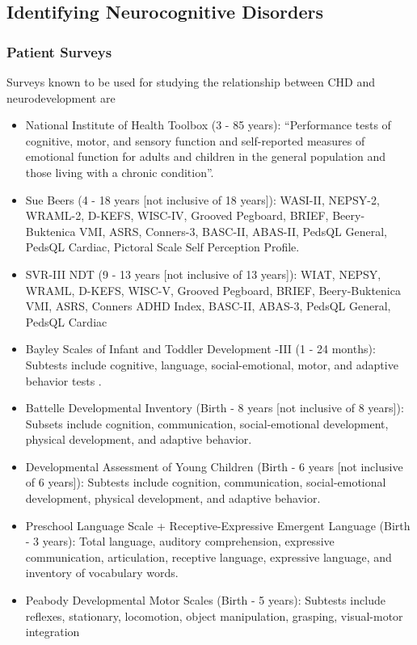 \subsection{Identifying Neurocognitive Disorders}

\subsubsection{Patient Surveys}

Surveys known to be used for studying the relationship between CHD and neurodevelopment are

\begin{itemize}
\item National Institute of Health Toolbox (3 - 85 years): ``Performance tests of cognitive, motor, and sensory function and self-reported measures of emotional function for adults and children in the general population and those living with a chronic condition''.

\item Sue Beers (4 - 18 years [not inclusive of 18 years]): WASI-II, NEPSY-2, WRAML-2, D-KEFS, WISC-IV, Grooved Pegboard, BRIEF, Beery-Buktenica VMI, ASRS, Conners-3, BASC-II, ABAS-II, PedsQL General, PedsQL Cardiac, Pictoral Scale Self Perception Profile.

\item SVR-III NDT (9 - 13 years [not inclusive of 13 years]): WIAT, NEPSY, WRAML, D-KEFS, WISC-V, Grooved Pegboard, BRIEF, Beery-Buktenica VMI, ASRS, Conners ADHD Index, BASC-II, ABAS-3, PedsQL General, PedsQL Cardiac

\item Bayley Scales of Infant and Toddler Development -III (1 - 24 months): Subtests include cognitive, language, social-emotional, motor, and adaptive behavior tests \cite{Mebius2017}.

\item Battelle Developmental Inventory (Birth - 8 years [not inclusive of 8 years]): Subsets include cognition, communication, social-emotional development, physical development, and adaptive behavior.

\item Developmental Assessment of Young Children (Birth - 6 years [not inclusive of 6 years]): Subtests include cognition, communication, social-emotional development, physical development, and adaptive behavior.

\item Preschool Language Scale + Receptive-Expressive Emergent Language (Birth - 3 years): Total language, auditory comprehension, expressive communication, articulation, receptive language, expressive language, and inventory of vocabulary words.

\item Peabody Developmental Motor Scales (Birth - 5 years): Subtests include reflexes, stationary, locomotion, object manipulation, grasping, visual-motor integration
\end{itemize}

